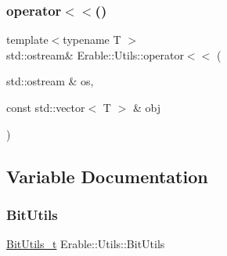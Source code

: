 \subsubsection{\texorpdfstring{operator$<$$<$()}{operator<<()}}
{\footnotesize\ttfamily template$<$typename T $>$ \\
std\+::ostream\& Erable\+::\+Utils\+::operator$<$$<$ (\begin{DoxyParamCaption}\item[{std\+::ostream \&}]{os,  }\item[{const std\+::vector$<$ T $>$ \&}]{obj }\end{DoxyParamCaption})}



\subsection{Variable Documentation}
\mbox{\label{namespace_erable_1_1_utils_a727a49112d12a43019e05cb2fde93855}} 
\subsubsection{\texorpdfstring{BitUtils}{BitUtils}}
{\footnotesize\ttfamily \mbox{\hyperlink{class_erable_1_1_utils_1_1_bit_utils__t}{Bit\+Utils\+\_\+t}} Erable\+::\+Utils\+::\+Bit\+Utils\hspace{0.3cm}{\ttfamily [inline]}}

